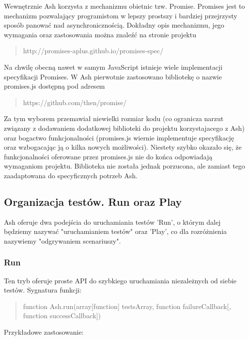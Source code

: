 \documentclass[a4paper]{article}
\begin{document}
Wewnętrznie Ash korzysta z mechanizmu obietnic tzw. Promise. Promises jest to mechanizm pozwalający programistom w lepszy prostszy i bardziej przejrzysty sposób panować nad  asynchronicznością. Dokładny opis mechanizmu, jego wymagania oraz zastosowania można znaleźć na  stronie projektu

\begin{quote}
http://promises-aplus.github.io/promises-spec/
\end{quote}

Na chwilę obecną nawet w samym JavaScript istnieje wiele implementacji specyfikacji Promises. W Ash pierwotnie zastosowano bibliotekę o nazwie promises.js dostępną pod adresem

\begin{quote}
https://github.com/then/promise/
\end{quote}

Za tym wyborem przemawiał niewielki rozmiar kodu (co ogranicza narzut związany z dodawaniem dodatkowej biblioteki do projektu korzystajacego z Ash) oraz bogactwo funkcjonalności (promises.js wiernie implementuje specyfikację oraz wzbogacając ją o kilka  nowych możliwości). Niestety szybko okazało się, że funkcjonalności oferowane przez promises.js nie do końca odpowiadają wymaganiom projektu. Biblioteka nie została jednak porzucona, ale zamiast tego zaadaptowana do specyficznych potrzeb Ash.  

\subsection{Organizacja testów. Run oraz Play}

Ash oferuje dwa podejścia do uruchamiania testów 'Run', o którym dalej będziemy nazywać "uruchamianiem testów" oraz 'Play', co dla rozróżnienia nazywiemy "odgrywaniem scenariuszy".

\subsubsection{Run}

Ten tryb oferuje proste API do szybkiego uruchamiania niezależnych od siebie testów. Sygnatura funkcji: 

\begin{quote}
function Ash.run(array[function] testsArray, function failureCallback[, function successCallback]) 
\end{quote}

Przykładowe zastosowanie: 
\end{document}
